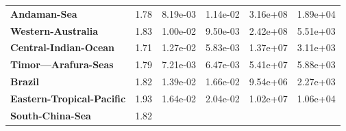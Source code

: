 \begin{table}[H]
{\begin{tabular}{llllll}
            \textbf{Andaman-Sea}                                & 1.78
                                                                & 8.19e-03
                                                                & 1.14e-02
                                                                & 3.16e+08
                                                                & 1.89e+04
            \\
            \textbf{Western-Australia}                          & 1.83
                                                                & 1.00e-02
                                                                & 9.50e-03
                                                                & 2.42e+08
                                                                & 5.51e+03
            \\
            \textbf{Central-Indian-Ocean}                       & 1.71
                                                                & 1.27e-02
                                                                & 5.83e-03
                                                                & 1.37e+07
                                                                & 3.11e+03
            \\
            \textbf{Timor---Arafura-Seas}                       & 1.79
                                                                & 7.21e-03
                                                                & 6.47e-03
                                                                & 5.41e+07
                                                                & 5.88e+03
            \\
            \textbf{Brazil}                                     & 1.82
                                                                & 1.39e-02
                                                                & 1.66e-02
                                                                & 9.54e+06
                                                                & 2.27e+03
            \\
            \textbf{Eastern-Tropical-Pacific}                   & 1.93
                                                                & 1.64e-02
                                                                & 2.04e-02
                                                                & 1.02e+07
                                                                & 1.06e+04
            \\
            \textbf{South-China-Sea}                            & 1.82

\end{tabular}}
\end{table}
